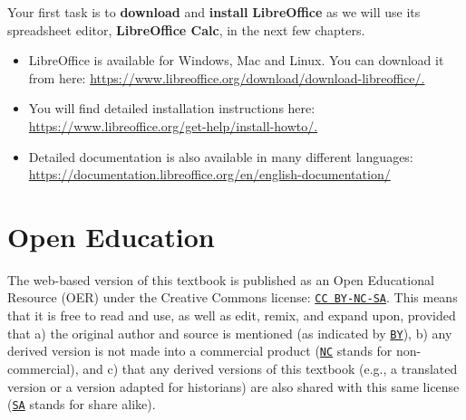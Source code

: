 \documentclass[
  letterpaper,
  DIV=11,
  numbers=noendperiod]{scrreprt}
\begin{document}
\begin{tcolorbox}[enhanced jigsaw, colbacktitle=quarto-callout-caution-color!10!white, rightrule=.15mm, breakable, toprule=.15mm, toptitle=1mm, colframe=quarto-callout-caution-color-frame, bottomrule=.15mm, coltitle=black, opacityback=0, titlerule=0mm, opacitybacktitle=0.6, title=\textcolor{quarto-callout-caution-color}{\faFire}\hspace{0.5em}{Task 1}, left=2mm, arc=.35mm, leftrule=.75mm, bottomtitle=1mm, colback=white]

Your first task is to \textbf{download} and \textbf{install}
\textbf{LibreOffice} as we will use its spreadsheet editor,
\textbf{LibreOffice Calc}, in the next few chapters.

\begin{itemize}
\item
  LibreOffice is available for Windows, Mac and Linux. You can download
  it from here:
  \url{https://www.libreoffice.org/download/download-libreoffice/.}
\item
  You will find detailed installation instructions here:
  \href{https://www.libreoffice.org/get-help/install-howto/.You}{https://www.libreoffice.org/get-help/install-howto/.}
\item
  Detailed documentation is also available in many different languages:
  \url{https://documentation.libreoffice.org/en/english-documentation/}
\end{itemize}

\end{tcolorbox}

\section{Open Education}\label{open-education}

The web-based version of this textbook is published as an Open
Educational Resource (OER) under the Creative Commons license:
\href{https://creativecommons.org/licenses/by-nc-sa/4.0/}{\texttt{CC\ BY-NC-SA}}.
This means that it is free to read and use, as well as edit, remix, and
expand upon, provided that a) the original author and source is
mentioned (as indicated by
\href{https://creativecommons.org/licenses/by-nc-sa/4.0/}{\texttt{BY}}),
b) any derived version is not made into a commercial product
(\href{https://creativecommons.org/licenses/by-nc-sa/4.0/}{\texttt{NC}}
stands for non-commercial), and c) that any derived versions of this
textbook (e.g., a translated version or a version adapted for
historians) are also shared with this same license
(\href{https://creativecommons.org/licenses/by-nc-sa/4.0/}{\texttt{SA}}
stands for share alike).
\end{document}
